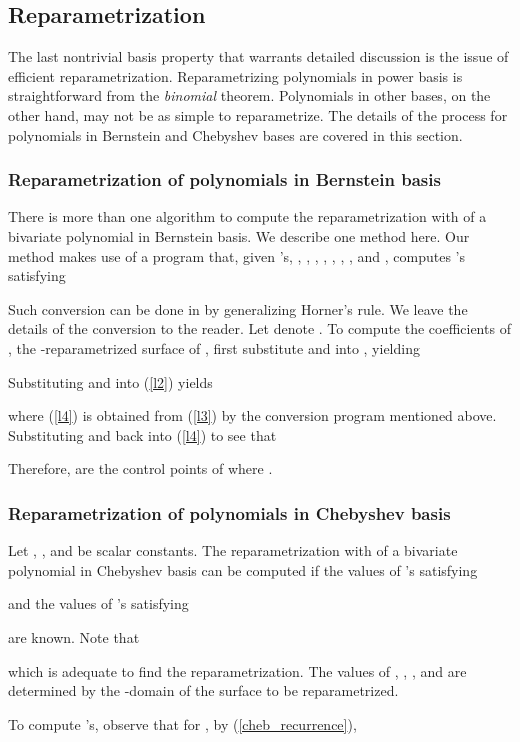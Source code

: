 \documentclass[12pt]{article}
\begin{document}
\subsection{Reparametrization}
The last nontrivial basis property that warrants detailed discussion
is the issue of efficient reparametrization.
Reparametrizing polynomials
in power basis is straightforward from the \emph{binomial} theorem.
Polynomials in other bases, on
the other hand, may not be as simple to reparametrize.  The
details of the process for polynomials in Bernstein and Chebyshev
bases are covered in this section.

\subsubsection{Reparametrization of polynomials in Bernstein
basis}  There is more than one algorithm to compute the
reparametrization with  of a bivariate polynomial in
Bernstein basis. We describe one method here. Our method makes use
of a program that, given 's, , , , , ,
, , and , computes 's satisfying

Such conversion can be done in  by
generalizing Horner's rule. We leave the details of the conversion
to the reader. Let  denote . To compute the coefficients
 of , the -reparametrized surface
of , first substitute  and  into , yielding

Substituting  and 
into (\ref{l2}) yields

where (\ref{l4}) is obtained from (\ref{l3}) by
the conversion program mentioned above. Substituting  and  back
into (\ref{l4}) to see that

Therefore,  are the
control points of  where .

\subsubsection{Reparametrization of polynomials in Chebyshev
basis}  Let , ,  and  be scalar constants.  The
reparametrization with  of a bivariate polynomial in
Chebyshev basis can be computed if the values of 's
 satisfying

and the values of 's  satisfying

are known.  Note that

which is adequate to find the reparametrization.  The values of
, , , and  are determined by the -domain of the
surface to be reparametrized.

To compute 's, observe that for , by
(\ref{cheb_recurrence}),
\end{document}
